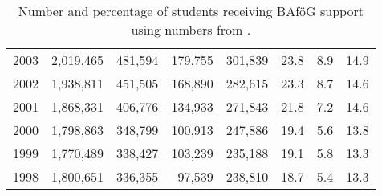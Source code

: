 \begin{table}
\begin{tabular}{rrrrrrrr}
2003 & 2,019,465 & 481,594 & 179,755 & 301,839 & 23.8 & 8.9 & 14.9 \\
2002 & 1,938,811 & 451,505 & 168,890 & 282,615 & 23.3 & 8.7 & 14.6 \\
2001 & 1,868,331 & 406,776 & 134,933 & 271,843 & 21.8 & 7.2 & 14.6 \\
2000 & 1,798,863 & 348,799 & 100,913 & 247,886 & 19.4 & 5.6 & 13.8 \\
1999 & 1,770,489 & 338,427 & 103,239 & 235,188 & 19.1 & 5.8 & 13.3 \\
1998 & 1,800,651 & 336,355 & 97,539 & 238,810 & 18.7 & 5.4 & 13.3 \\
\bottomrule
\end{tabular}
\caption{\small{
        Number and percentage of students receiving BAföG support using numbers from \cite{destatis_bafoeg_data}. 
}}
\label{table:bafoeg_support_landscape}
\end{table}








